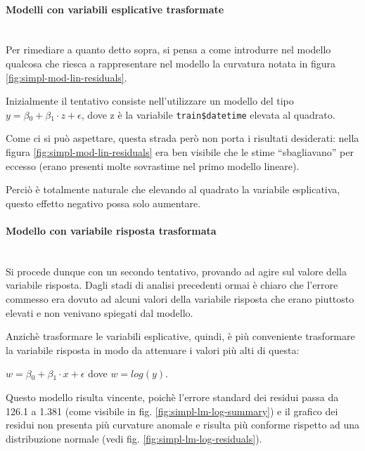 \paragraph{Modelli con variabili esplicative trasformate} \mbox{}\\
Per rimediare a quanto detto sopra, si pensa a come introdurre nel modello
qualcosa che riesca a rappresentare nel modello la curvatura notata in figura
\ref{fig:simpl-mod-lin-residuals}.

Inizialmente il tentativo consiste nell'utilizzare un modello del tipo
$ y = \beta{}_0 + \beta{}_1 \cdot{} z + \epsilon{} $, dove z è la variabile
\texttt{train\$datetime} elevata al quadrato.

Come ci si può aspettare, questa strada però non porta i risultati desiderati:
nella figura \ref{fig:simpl-mod-lin-residuals} era ben visibile che le stime
``sbagliavano'' per eccesso (erano presenti molte sovrastime nel primo modello
lineare).

Perciò è totalmente naturale che elevando al quadrato la variabile esplicativa,
questo effetto negativo possa solo aumentare.

\paragraph{Modello con variabile risposta trasformata} \mbox{}\\
Si procede dunque con un secondo tentativo, provando ad agire sul valore della
variabile risposta. Dagli stadi di analisi precedenti ormai è chiaro che
l'errore commesso era dovuto ad alcuni valori della variabile risposta che
erano piuttosto elevati e non venivano spiegati dal modello.

Anzichè trasformare le variabili esplicative, quindi, è più conveniente
trasformare la variabile risposta in modo da attenuare i valori più alti di
questa:

\centering $ w = \beta{}_0 + \beta{}_1 \cdot{} x + \epsilon{} $
\flushleft dove $ w = log(y) $.

Questo modello risulta vincente, poichè l'errore standard dei residui passa da
126.1 a 1.381 (come visibile in fig. \ref{fig:simpl-lm-log-summary}) e il
grafico dei residui non presenta più curvature anomale e risulta più conforme
rispetto ad una distribuzione normale (vedi fig.
\ref{fig:simpl-lm-log-residuals}).

